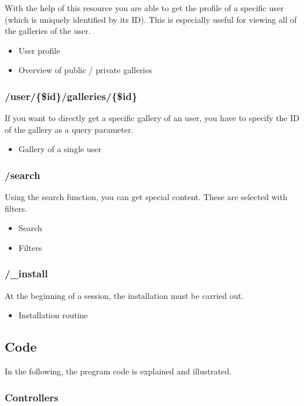 \documentclass[a4paper,12pt,oneside]{article} %
\begin{document}
With the help of this resource you are able to get the profile of
a specific user (which is uniquely identified by its ID). This is
especially useful for viewing all of the galleries of the user.
\begin{itemize}
\item User profile
\item Overview of public / private galleries
\end{itemize}

\subsubsection{/user/\{\$id\}/galleries/\{\$id\}}

If you want to directly get a specific gallery of an user, you have
to specify the ID of the gallery as a query parameter.
\begin{itemize}
\item Gallery of a single user
\end{itemize}

\subsubsection{/search}

Using the search function, you can get special content. These are selected
with filters.
\begin{itemize}
\item Search
\item Filters
\end{itemize}

\subsubsection{/\_install}

At the beginning of a session, the installation must be carried out.
\begin{itemize}
\item Installation routine
\end{itemize}

\subsection{Code}

In the following, the program code is explained and illustrated.


\subsubsection{Controllers}
\end{document}
